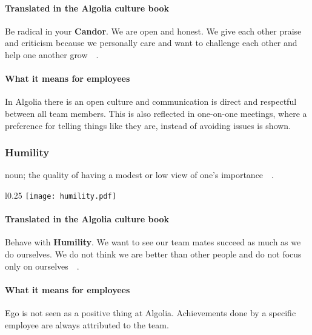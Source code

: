 \paragraph{Translated in the Algolia culture book}

Be radical in your \textbf{Candor}. We are open and honest. We give each other praise and criticism because we personally care and want to challenge each other and help one another grow~\cite{algolia-careers}~.

\paragraph{What it means for employees} 

In Algolia there is an open culture and communication is direct and respectful between all team members. This is also reflected in one-on-one meetings, where a preference for telling things like they are, instead of avoiding issues is shown.

\subsubsection{Humility}
\label{ssub:humility}

\begin{definition}
noun; the quality of having a modest or low view of one's importance~\cite{oxford-humility}~.
\end{definition}

\begin{wrapfigure}{l}{0.25\textwidth}
  \centering
  \texttt{[image: humility.pdf]}
\end{wrapfigure}

\paragraph{Translated in the Algolia culture book}

Behave with \textbf{Humility}. We want to see our team mates succeed as much as we do ourselves. We do not think we are better than other people and do not focus only on ourselves~\cite{algolia-careers}~.

\paragraph{What it means for employees} 

Ego is not seen as a positive thing at Algolia. Achievements done by a specific employee are always attributed to the team.

